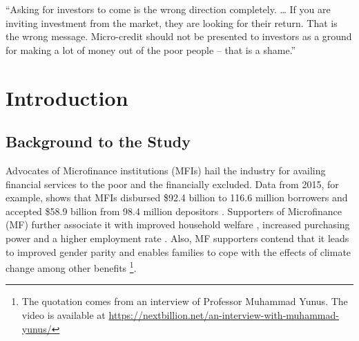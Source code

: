 \documentclass[a4paper, nobind]{templates/ociamthesis}
\begin{document}
\begin{romanpages}
\tableofcontents

\listoffigures
	\mtcaddchapter

\listoftables
  \mtcaddchapter


\end{romanpages}

\flushbottom

\begin{savequote}
``Asking for investors to come is the wrong direction completely.
\ldots{} If you are inviting investment from the market, they are
looking for their return. That is the wrong message. Micro-credit should
not be presented to investors as a ground for making a lot of money out
of the poor people -- that is a shame.''
\end{savequote}



\hypertarget{Introduction}{%
\chapter{Introduction}\label{Introduction}}

\minitoc 

\hypertarget{background-to-the-study}{%
\section{Background to the Study}\label{background-to-the-study}}

\noindent Advocates of Microfinance institutions (MFIs) hail the industry for availing financial services to the poor and the financially excluded. Data from 2015, for example, shows that MFIs disbursed \$92.4 billion to 116.6 million borrowers and accepted \$58.9 billion from 98.4 million depositors \autocite{market2014global}. Supporters of Microfinance (MF) further associate it with improved household welfare \autocite{meador2017food,you2013role}, increased purchasing power and a higher employment rate \autocite{raihan2017macro,lopatta2016microfinance}. Also, MF supporters contend that it leads to improved gender parity \autocite{mafukata2017reciprocal,zhang2017microfinance} and enables families to cope with the effects of climate change \autocite{fenton2017role} among other benefits \footnote{The quotation comes from an interview of Professor Muhammad Yunus. The video is available at \url{https://nextbillion.net/an-interview-with-muhammad-yunus/}}.
\end{document}
